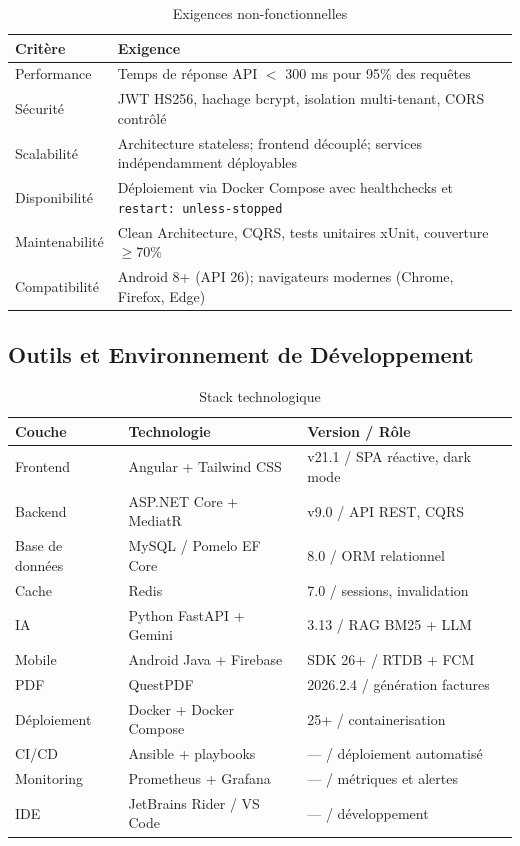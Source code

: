 \documentclass[12pt,a4paper]{report}
\begin{document}
\begin{table}[H]
\centering
\caption{Exigences non-fonctionnelles}
\begin{tabularx}{\textwidth}{|l|X|}
\hline
\rowcolor{indigolite!30}
\textbf{Critère} & \textbf{Exigence} \\
\hline
Performance & Temps de réponse API $<$ 300 ms pour 95\% des requêtes \\
\hline
Sécurité & JWT HS256, hachage bcrypt, isolation multi-tenant, CORS contrôlé \\
\hline
Scalabilité & Architecture stateless; frontend découplé; services indépendamment déployables \\
\hline
Disponibilité & Déploiement via Docker Compose avec healthchecks et \texttt{restart: unless-stopped} \\
\hline
Maintenabilité & Clean Architecture, CQRS, tests unitaires xUnit, couverture $\geq 70\%$ \\
\hline
Compatibilité & Android 8+ (API 26); navigateurs modernes (Chrome, Firefox, Edge) \\
\hline
\end{tabularx}
\end{table}

\subsection{Outils et Environnement de Développement}

\begin{table}[H]
\centering
\caption{Stack technologique}
\begin{tabularx}{\textwidth}{|l|l|X|}
\hline
\rowcolor{indigolite!30}
\textbf{Couche} & \textbf{Technologie} & \textbf{Version / Rôle} \\
\hline
Frontend & Angular + Tailwind CSS & v21.1 / SPA réactive, dark mode \\
\hline
Backend & ASP.NET Core + MediatR & v9.0 / API REST, CQRS \\
\hline
Base de données & MySQL / Pomelo EF Core & 8.0 / ORM relationnel \\
\hline
Cache & Redis & 7.0 / sessions, invalidation \\
\hline
IA & Python FastAPI + Gemini & 3.13 / RAG BM25 + LLM \\
\hline
Mobile & Android Java + Firebase & SDK 26+ / RTDB + FCM \\
\hline
PDF & QuestPDF & 2026.2.4 / génération factures \\
\hline
Déploiement & Docker + Docker Compose & 25+ / containerisation \\
\hline
CI/CD & Ansible + playbooks & — / déploiement automatisé \\
\hline
Monitoring & Prometheus + Grafana & — / métriques et alertes \\
\hline
IDE & JetBrains Rider / VS Code & — / développement \\
\hline
\end{tabularx}
\end{table}
\end{document}
